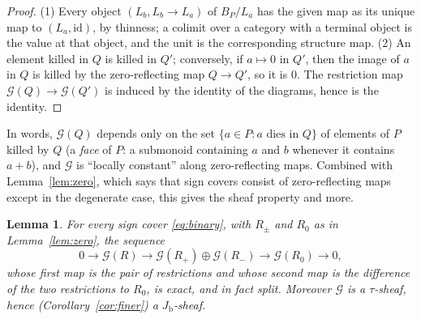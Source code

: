 \documentclass[11pt]{article}
\newcommand{\Jb}{J_{\mathrm b}}
\newcommand{\G}{\mathcal G}
\newtheorem{lemma}[theorem]{Lemma}
\theoremstyle{definition}
\theoremstyle{remark}
\begin{document}
\begin{proof}
(1) Every object \((L_b,L_b\to L_a)\) of \(B_P/L_a\) has the given map as
its unique map to \((L_a,\mathrm{id})\), by thinness; a colimit over a
category with a terminal object is the value at that object, and the unit
is the corresponding structure map.  (2) An element killed in \(Q\) is
killed in \(Q'\); conversely, if \(a\mapsto0\) in \(Q'\), then the image of
\(a\) in \(Q\) is killed by the zero-reflecting map \(Q\to Q'\), so it is
\(0\).  The restriction map \(\G(Q)\to\G(Q')\) is induced by the identity of
the diagrams, hence is the identity.
\end{proof}

In words, \(\G(Q)\) depends only on the set \(\{a\in P:a\text{ dies in }Q\}\)
of elements of \(P\) killed by \(Q\) (a \emph{face} of \(P\): a submonoid
containing \(a\) and \(b\) whenever it contains \(a+b\)), and \(\G\) is
``locally constant'' along zero-reflecting maps.  Combined with Lemma~\ref{lem:zero}, which says that
sign covers consist of zero-reflecting maps except in the degenerate case,
this gives the sheaf property and more.

\begin{lemma}\label{lem:mvsections}
For every sign cover \eqref{eq:binary}, with \(R_\pm\) and \(R_0\) as in
Lemma~\ref{lem:zero}, the sequence
\begin{equation}
 0\longrightarrow\G(R)
   \longrightarrow\G(R_+)\oplus\G(R_-)
   \longrightarrow\G(R_0)\longrightarrow0,
                         \label{eq:mvsections}
\end{equation}
whose first map is the pair of restrictions and whose second map is the
difference of the two restrictions to \(R_0\), is exact, and in fact split.
Moreover \(\G\) is a
\(\tau\)-sheaf, hence (Corollary~\ref{cor:finer}) a \(\Jb\)-sheaf.
\end{lemma}
\end{document}

